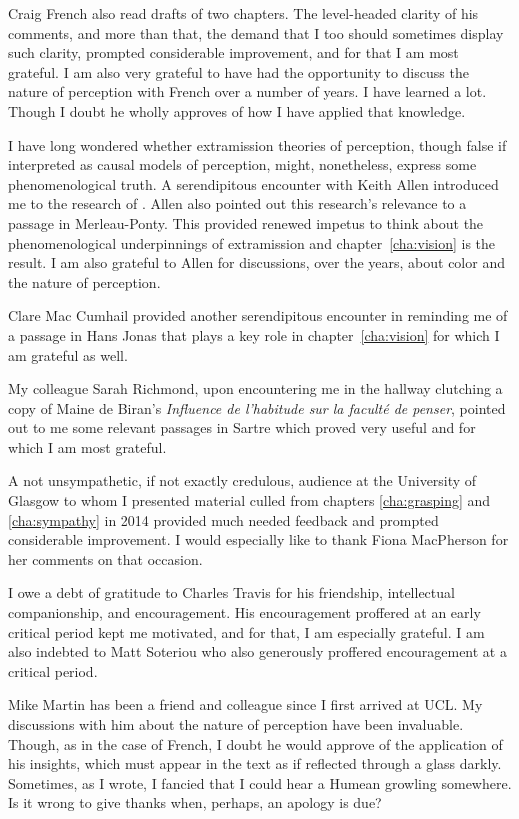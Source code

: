 Craig French also read drafts of two chapters. The level-headed clarity of his comments, and more than that, the demand that I too should sometimes display such clarity, prompted considerable improvement, and for that I am most grateful. I am also very grateful to have had the opportunity to discuss the nature of perception with French over a number of years. I have learned a lot. Though I doubt he wholly approves of how I have applied that knowledge.

I have long wondered whether extramission theories of perception, though false if interpreted as causal models of perception, might, nonetheless, express some phenomenological truth. A serendipitous encounter with Keith Allen introduced me to the research of \citet{Winer:1996as}. Allen also pointed out this research's relevance to a passage in Merleau-Ponty. This provided renewed impetus to think about the phenomenological underpinnings of extramission and chapter~\ref{cha:vision} is the result. I am also grateful to Allen for discussions, over the years, about color and the nature of perception.

Clare Mac Cumhail provided another serendipitous encounter in reminding me of a passage in Hans Jonas that plays a key role in chapter~\ref{cha:vision} for which I am grateful as well.

My colleague Sarah Richmond, upon encountering me in the hallway clutching a copy of Maine de Biran's \emph{Influence de l'habitude sur la facult\'{e} de penser}, pointed out to me some relevant passages in Sartre which proved very useful and for which I am most grateful.

A not unsympathetic, if not exactly credulous, audience at the University of Glasgow to whom I presented material culled from chapters \ref{cha:grasping} and \ref{cha:sympathy} in 2014 provided much needed feedback and prompted considerable improvement. I would especially like to thank Fiona MacPherson for her comments on that occasion.

I owe a debt of gratitude to Charles Travis for his friendship, intellectual companionship, and encouragement. His encouragement proffered at an early critical period kept me motivated, and for that, I am especially grateful. I am also indebted to Matt Soteriou who also generously proffered encouragement at a critical period.

Mike Martin has been a friend and colleague since I first arrived at UCL. My discussions with him about the nature of perception have been invaluable. Though, as in the case of French, I doubt he would approve of the application of his insights, which must appear in the text as if reflected through a glass darkly. Sometimes, as I wrote, I fancied that I could hear a Humean growling somewhere. Is it wrong to give thanks when, perhaps, an apology is due?

